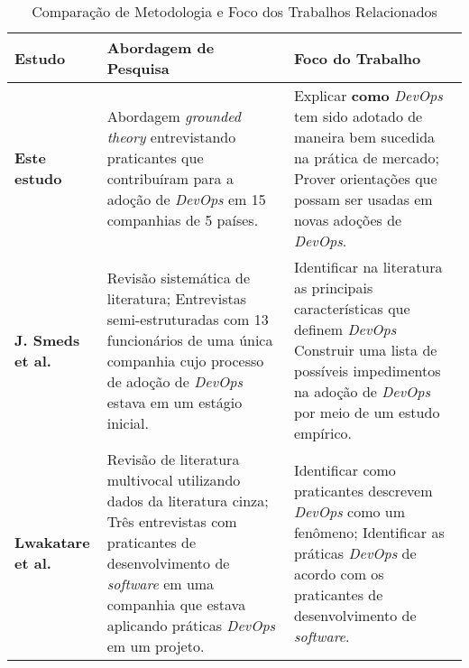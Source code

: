 \begin{table}[hb!]
\centering
\caption{Comparação de Metodologia e Foco dos Trabalhos Relacionados}
\label{related_work_table}
\begin{tabular}{|p{3cm}|p{6cm}|p{6cm}|}
\hline

\textbf{Estudo}
& \textbf{Abordagem de Pesquisa}
& \textbf{Foco do Trabalho} \\

\hline

\textbf{Este estudo}

& Abordagem {\it grounded theory} entrevistando praticantes que contribuíram
para a adoção de {\it DevOps} em 15 companhias de 5 países.

& Explicar {\bf como} {\it DevOps} tem sido adotado de maneira bem sucedida na prática de mercado;\newline
\newline Prover orientações que possam ser usadas em novas adoções de {\it DevOps}. \\

\hline

\textbf{J. Smeds et al.~\cite{devops_a_definition}}

& Revisão sistemática de literatura; \newline \newline Entrevistas semi-estruturadas
com 13 funcionários de uma única companhia cujo processo de adoção de {\it DevOps}
estava em um estágio inicial.

& Identificar na literatura as principais características que definem {\it DevOps}
\newline \newline
Construir uma lista de possíveis impedimentos na adoção de {\it DevOps} por meio
de um estudo empírico. \\

\hline

\textbf{Lwakatare et al.~\cite{extending_dimensions}}

&
Revisão de literatura multivocal utilizando dados da literatura cinza; \newline \newline
Três entrevistas com praticantes de desenvolvimento de {\it software} em uma
companhia que estava aplicando práticas {\it DevOps} em um projeto.

& Identificar como praticantes descrevem {\it DevOps} como um fenômeno; \newline
\newline Identificar as práticas {\it DevOps} de acordo com os praticantes de
desenvolvimento de {\it software}. \\


\end{tabular}
\end{table}
